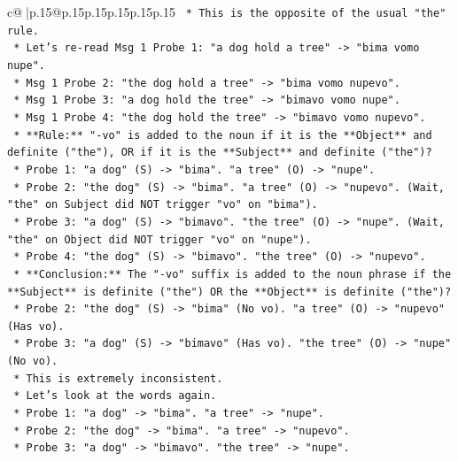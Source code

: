 \documentclass{article}
\begin{document}
{\begin{supertabular}{c@{$\;$}|p{.15\linewidth}@{}p{.15\linewidth}p{.15\linewidth}p{.15\linewidth}p{.15\linewidth}p{.15\linewidth}}
{{{\texttt{            *   This is the opposite of the usual "the" rule.} \\
\texttt{            *   Let's re{-}read Msg 1 Probe 1: "a dog hold a tree" {-}> "bima vomo nupe".} \\
\texttt{            *   Msg 1 Probe 2: "the dog hold a tree" {-}> "bima vomo nupevo".} \\
\texttt{            *   Msg 1 Probe 3: "a dog hold the tree" {-}> "bimavo vomo nupe".} \\
\texttt{            *   Msg 1 Probe 4: "the dog hold the tree" {-}> "bimavo vomo nupevo".} \\
\texttt{            *   **Rule:** "{-}vo" is added to the noun if it is the **Object** and definite ("the"), OR if it is the **Subject** and definite ("the")?} \\
\texttt{                *   Probe 1: "a dog" (S) {-}> "bima". "a tree" (O) {-}> "nupe".} \\
\texttt{                *   Probe 2: "the dog" (S) {-}> "bima". "a tree" (O) {-}> "nupevo". (Wait, "the" on Subject did NOT trigger "vo" on "bima").} \\
\texttt{                *   Probe 3: "a dog" (S) {-}> "bimavo". "the tree" (O) {-}> "nupe". (Wait, "the" on Object did NOT trigger "vo" on "nupe").} \\
\texttt{                *   Probe 4: "the dog" (S) {-}> "bimavo". "the tree" (O) {-}> "nupevo".} \\
\texttt{            *   **Conclusion:** The "{-}vo" suffix is added to the noun phrase if the **Subject** is definite ("the") OR the **Object** is definite ("the")?} \\
\texttt{                *   Probe 2: "the dog" (S) {-}> "bima" (No vo). "a tree" (O) {-}> "nupevo" (Has vo).} \\
\texttt{                *   Probe 3: "a dog" (S) {-}> "bimavo" (Has vo). "the tree" (O) {-}> "nupe" (No vo).} \\
\texttt{                *   This is extremely inconsistent.} \\
\texttt{                *   Let's look at the words again.} \\
\texttt{                    *   Probe 1: "a dog" {-}> "bima". "a tree" {-}> "nupe".} \\
\texttt{                    *   Probe 2: "the dog" {-}> "bima". "a tree" {-}> "nupevo".} \\
\texttt{                    *   Probe 3: "a dog" {-}> "bimavo". "the tree" {-}> "nupe".} \\
}}}
\end{supertabular}}
\end{document}
